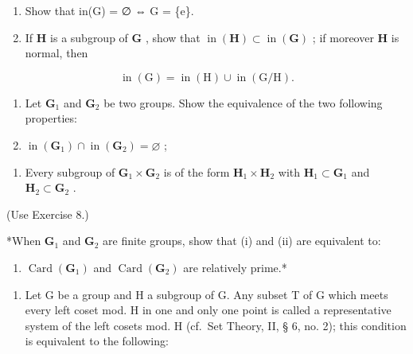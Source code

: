 \begin{enumerate}
\def\labelenumi{(\alph{enumi})}
\item
  Show that in(G) = ∅ ⇔ G = \{e\}.
\item
  If \(\mathbf{H}\) is a subgroup of \(\mathbf{G}\) , show that \(\operatorname{in}(\mathbf{H}) \subset \operatorname{in}(\mathbf{G})\) ; if moreover \(\mathbf{H}\) is normal, then
\end{enumerate}

\[
\operatorname{in} (\mathrm{G}) = \operatorname{in} (\mathrm{H}) \cup \operatorname{in} (\mathrm{G} / \mathrm{H}).
\]

\begin{enumerate}
\def\labelenumi{(\alph{enumi})}
\setcounter{enumi}{2}
\item
  Let \(\mathbf{G}_1\) and \(\mathbf{G}_2\) be two groups. Show the equivalence of the two following properties:
\item
  \(\operatorname{in}(\mathbf{G}_1) \cap \operatorname{in}(\mathbf{G}_2) = \varnothing\) ;
\end{enumerate}

\begin{enumerate}
\def\labelenumi{(\roman{enumi})}
\setcounter{enumi}{1}
\tightlist
\item
  Every subgroup of \(\mathbf{G}_1\times \mathbf{G}_2\) is of the form \(\mathbf{H}_1\times \mathbf{H}_2\) with \(\mathbf{H}_1\subset \mathbf{G}_1\) and \(\mathbf{H}_2\subset \mathbf{G}_2\) .
\end{enumerate}

(Use Exercise 8.)

*When \(\mathbf{G}_1\) and \(\mathbf{G}_2\) are finite groups, show that (i) and (ii) are equivalent to:

\begin{enumerate}
\def\labelenumi{(\roman{enumi})}
\setcounter{enumi}{2}
\tightlist
\item
  \(\operatorname{Card}(\mathbf{G}_1)\) and \(\operatorname{Card}(\mathbf{G}_2)\) are relatively prime.*
\end{enumerate}

\begin{enumerate}
\def\labelenumi{\arabic{enumi}.}
\setcounter{enumi}{13}
\tightlist
\item
  Let G be a group and H a subgroup of G. Any subset T of G which meets every left coset mod. H in one and only one point is called a representative system of the left cosets mod. H (cf.~Set Theory, II, § 6, no. 2); this condition is equivalent to the following:
\end{enumerate}

